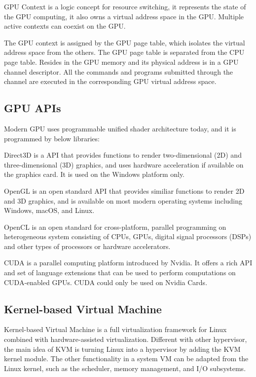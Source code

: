 \documentclass[a4paper,12pt]{article}
\begin{document}
GPU Context is a logic concept for resource switching, it represents the state of the GPU computing, it also owns a virtual address space in the GPU. Multiple active contexts can coexist on the GPU.

The GPU context is assigned by the GPU page table, which isolates the virtual address space from the others. The GPU page table is separated from the CPU page table. Resides in the GPU memory and its physical address is in a GPU channel descriptor. All the commands and programs submitted through the channel are executed in the corresponding GPU virtual address space.

\subsection{GPU APIs}
Modern GPU uses programmable unified shader architecture today, and it is programmed by below libraries\cite{Dowty:2009:GVV:1618525.1618534}:

Direct3D is a API that provides functions to render two-dimensional (2D) and three-dimensional (3D) graphics, and uses hardware acceleration if available on the graphics card. It is used on the Windows platform only.

OpenGL is an open standard API that provides similiar functions to render 2D and 3D graphics, and is available on most modern operating systems including Windows, macOS, and Linux.

OpenCL is an open standard for cross-platform, parallel programming on heterogeneous system consisting of CPUs, GPUs, digital signal processors (DSPs) and other types of processors or hardware accelerators. 

CUDA is a parallel computing platform introduced by Nvidia. It offers a rich API and set of language extensions that can be used to perform computations on CUDA-enabled GPUs. CUDA could only be used on Nvidia Cards.

\subsection{Kernel-based Virtual Machine}

Kernel-based Virtual Machine is a full virtualization framework for Linux combined with hardware-assisted virtualization. Different with other hypervisor, the main idea of KVM is turning Linux into a hypervisor by adding the KVM kernel module. The other functionality in a system VM can be adapted from the Linux kernel, such as the scheduler, memory management, and I/O subsystems\cite{kvm}.
\end{document}
